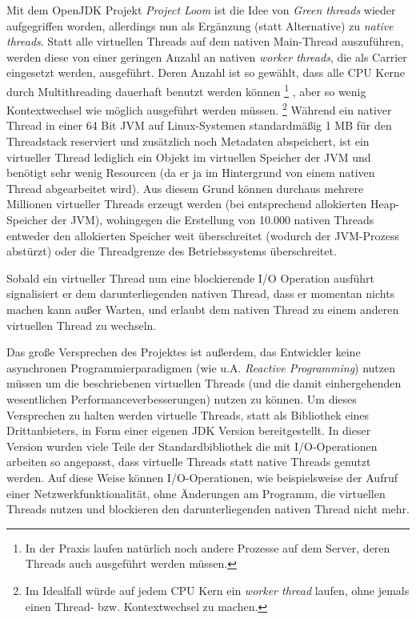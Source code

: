 Mit dem OpenJDK Projekt \textit{Project Loom} ist die Idee von \textit{Green threads}
wieder aufgegriffen worden, allerdings nun als Ergänzung (statt Alternative) zu \textit{native threads}.
Statt alle virtuellen Threads auf dem nativen Main-Thread auszuführen, werden diese von einer geringen Anzahl an nativen \textit{worker threads},
die als Carrier eingesetzt werden, ausgeführt.
Deren Anzahl ist so gewählt, dass alle CPU Kerne durch Multithreading dauerhaft benutzt werden können
\footnote{In der Praxis laufen natürlich noch andere Prozesse auf dem Server, deren Threads auch ausgeführt werden müssen.}
, aber so wenig Kontextwechsel wie möglich ausgeführt werden müssen.
\parencite{Oracle2021} \footnote{Im Idealfall würde auf jedem CPU Kern ein \textit{worker thread} laufen,
	ohne jemals einen Thread- bzw. Kontextwechsel zu machen.}
Während ein nativer Thread in einer 64 Bit JVM auf Linux-Systemen standardmäßig 1 MB für den Threadstack reserviert
und zusätzlich noch Metadaten abspeichert, ist ein virtueller Thread
lediglich ein Objekt im virtuellen Speicher der JVM und benötigt sehr wenig Resourcen (da er ja im Hintergrund von einem
nativen Thread abgearbeitet wird).
Aus diesem Grund können durchaus mehrere Millionen virtueller Threads erzeugt werden (bei entsprechend allokierten Heap-Speicher der JVM), wohingegen
die Erstellung von 10.000 nativen Threads entweder den allokierten Speicher weit überschreitet (wodurch der JVM-Prozess abstürzt) oder die Threadgrenze
des Betriebssystems überschreitet.

Sobald ein virtueller Thread nun eine blockierende I/O Operation ausführt signalisiert er dem darunterliegenden nativen Thread, dass er momentan nichts machen
kann außer Warten, und erlaubt dem nativen Thread zu einem anderen virtuellen Thread zu wechseln.

Das große Versprechen des Projektes ist außerdem, das Entwickler keine asynchronen Programmierparadigmen (wie u.A. \textit{Reactive Programming})
nutzen müssen um die beschriebenen virtuellen Threads (und die damit einhergehenden wesentlichen Performanceverbesserungen) nutzen zu können.
Um dieses Versprechen zu halten werden virtuelle Threads, statt als Bibliothek eines Drittanbieters, in Form einer eigenen JDK Version bereitgestellt.
In dieser Version wurden viele Teile der Standardbibliothek die mit I/O-Operationen arbeiten so angepasst, dass virtuelle Threads statt native Threads
genutzt werden. Auf diese Weise können I/O-Operationen, wie beispielsweise der Aufruf einer Netzwerkfunktionalität, ohne Änderungen am Programm,
die virtuellen Threads nutzen und blockieren den darunterliegenden nativen Thread nicht mehr.

